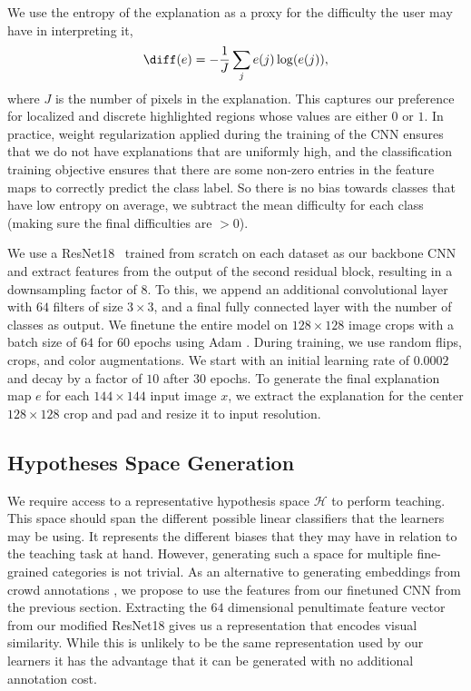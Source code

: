 \documentclass[../main.tex]{subfiles}
\begin{document}
We use the entropy of the explanation 
as a proxy for the difficulty the user may have in interpreting it,
\begin{equation}
 \diff(e) = -\frac{1}{J}\sum_{j}e(j)\log(e(j)),
\end{equation}
where $J$ is the number of pixels in the explanation.
This captures our preference for localized and discrete highlighted regions whose values are either $0$ or $1$. 
In practice, weight regularization applied during the training of the CNN ensures that we do not have explanations that are uniformly high, and the classification training objective ensures that there are some non-zero entries in the feature maps to correctly predict the class label.
So there is no bias towards classes that have low entropy on average, we subtract the mean difficulty for each class (making sure the final difficulties are $>0$).

We use a ResNet18~\cite{he2016deep} trained from scratch on each dataset as our backbone CNN and extract features from the output of the second residual block, resulting in a downsampling factor of $8$.
To this, we append an additional convolutional layer with $64$ filters of size $3\times3$, and a final fully connected layer with the number of classes as output.
We finetune the entire model on $128\times128$ image crops with a batch size of $64$ for $60$ epochs using Adam \cite{kingma2014adam}. 
During training, we use random flips, crops, and color augmentations.
We start with an initial learning rate of $0.0002$ and decay by a factor of $10$ after $30$ epochs.
To generate the final explanation map $e$ for each $144\times144$ input image $x$, we extract the explanation for the center $128\times128$ crop and pad and resize it to input resolution.



%
%
%
\subsection{Hypotheses Space Generation}
We require access to a representative hypothesis space $\mathcal{H}$ to perform teaching. 
This space should span the different possible linear classifiers that the learners may be using. 
It represents the different biases that they may have in relation to the teaching task at hand. 
However, generating such a space for multiple fine-grained categories is not trivial.
As an alternative to generating embeddings from crowd annotations \eg \cite{welinder2010multidimensional}, we propose to use the features from our finetuned CNN from the previous section. 
Extracting the $64$ dimensional penultimate feature vector from our modified ResNet18 gives us a representation that encodes visual similarity.
While this is unlikely to be the same representation used by our learners it has the advantage that it can be generated with no additional annotation cost. 
\end{document}

